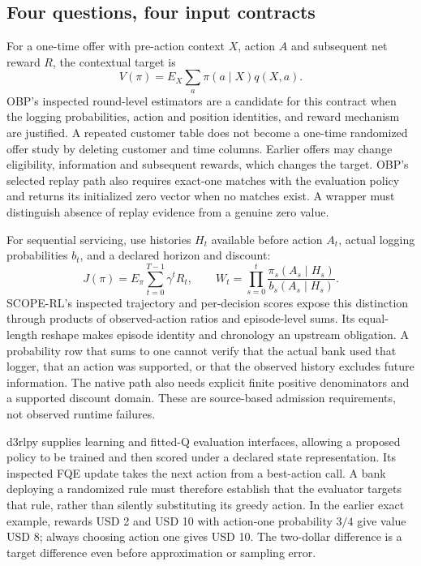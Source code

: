 \subsection{Four questions, four input contracts}

For a one-time offer with pre-action context $X$, action $A$ and subsequent net
reward $R$, the contextual target is
\[
 V(\pi)=E_X\sum_a\pi(a\mid X)q(X,a).
\]
OBP's inspected round-level estimators are a candidate for this contract when
the logging probabilities, action and position identities, and reward mechanism
are justified. A repeated customer table does not become a one-time randomized
offer study by deleting customer and time columns. Earlier offers may change
eligibility, information and subsequent rewards, which changes the target.
OBP's selected replay path also requires exact-one matches with the evaluation
policy and returns its initialized zero vector when no matches exist. A wrapper
must distinguish absence of replay evidence from a genuine zero value.
\citep{exec23_obp_sources}

For sequential servicing, use histories $H_t$ available before action $A_t$,
actual logging probabilities $b_t$, and a declared horizon and discount:
\[
 J(\pi)=E_\pi\sum_{t=0}^{T-1}\gamma^tR_t,
 \qquad W_t=\prod_{s=0}^{t}\frac{\pi_s(A_s\mid H_s)}{b_s(A_s\mid H_s)}.
\]
SCOPE-RL's inspected trajectory and per-decision scores expose this distinction
through products of observed-action ratios and episode-level sums. Its equal-length
reshape makes episode identity and chronology an upstream obligation. A probability
row that sums to one cannot verify that the actual bank used that logger, that
an action was supported, or that the observed history excludes future information.
The native path also needs explicit finite positive denominators and a supported
discount domain. These are source-based admission requirements, not observed
runtime failures.~\citep{exec23_scope_rl_sources}

d3rlpy supplies learning and fitted-Q evaluation interfaces, allowing a proposed
policy to be trained and then scored under a declared state representation.
Its inspected FQE update takes the next action from a best-action call. A bank
deploying a randomized rule must therefore establish that the evaluator targets
that rule, rather than silently substituting its greedy action. In the earlier
exact example, rewards USD 2 and USD 10 with action-one probability $3/4$ give
value USD 8; always choosing action one gives USD 10. The two-dollar difference
is a target difference even before approximation or sampling error.
\citep{exec15_d3rlpy_value,exec15_d3rlpy_exact}

